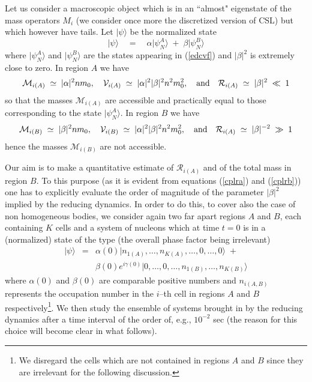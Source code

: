 \documentclass[12pt]{article}
\begin{document}
Let us consider a macroscopic object which is in an ``almost"
eigenstate of the mass operators $M_{i}$ (we consider once more
the discretized version of CSL) but which however have tails. Let
$|\psi\rangle$ be the normalized state
\begin{equation}
|\psi\rangle \quad  = \quad \alpha |\psi^{A}_{N}\rangle \; + \;
\beta |\psi^{B}_{N}\rangle
\end{equation}
where $|\psi^{A}_{N}\rangle$ and $|\psi^{B}_{N}\rangle$ are the
states appearing in (\ref{edcvf}) and $|\beta|^{2}$ is extremely
close to zero. In region $A$ we have
\begin{equation} \label{cplra}
{\mathcal M}_{i(A)} \; \simeq \; |\alpha|^{2}nm_{0}, \quad
{\mathcal V}_{i(A)} \; \simeq \; |\alpha|^{2}|\beta|^{2} n^{2}
m_{0}^{2}, \quad \makebox{and} \quad {\mathcal R}_{i(A)} \; \simeq
\; |\beta|^{2} \; \ll \; 1
\end{equation}
so that the masses ${\mathcal M}_{i(A)}$ are accessible and
practically equal to those corresponding to the state
$|\psi^{A}_{N}\rangle$. In region $B$ we have
\begin{equation} \label{cplrb}
{\mathcal M}_{i(B)} \; \simeq \; |\beta|^{2}nm_{0}, \quad
{\mathcal V}_{i(B)} \; \simeq \; |\alpha|^{2}|\beta|^{2} n^{2}
m_{0}^{2}, \quad \makebox{and} \quad {\mathcal R}_{i(A)} \; \simeq
\; |\beta|^{-2} \; \gg \; 1
\end{equation}
hence the masses ${\mathcal M}_{i(B)}$ are not accessible.

Our aim is to make a quantitative estimate of ${\mathcal
R}_{i(A)}$ and of the total mass in region $B$. To this purpose
(as it is evident from equations (\ref{cplra}) and (\ref{cplrb})) one
has to explicitly evaluate the order of magnitude of the parameter
$|\beta|^{2}$ implied by the  reducing dynamics. In order to do
this, to cover also the case of non homogeneous bodies, we
consider again two far apart regions $A$ and $B$, each containing
$K$ cells and a system of nucleons which at time $t=0$ is in a
(normalized) state of the type (the overall phase factor being
irrelevant)
\begin{eqnarray} \label{tps}
|\psi\rangle & = & \alpha(0)|n_{1(A)}, \ldots, n_{K(A)},
\ldots, 0, \ldots, 0\rangle \; + \nonumber \\
& & \beta(0) e^{i\gamma(0)} |0, \ldots, 0, \ldots, n_{1(B)},
\ldots, n_{K(B)} \rangle
\end{eqnarray}
where $\alpha(0)$ and $\beta(0)$ are comparable positive numbers
and $n_{i(A,B)}$  represents the occupation number in the $i$--th
cell in regions $A$ and $B$ respectively\footnote{We disregard the
cells which are not contained in regions $A$ and $B$ since they
are irrelevant for the following discussion.}. We then study the
ensemble of systems brought in by the reducing dynamics after a
time interval of the order of, e.g., $10^{-2}$ sec (the reason for
this choice will become clear in what follows).
\end{document}
